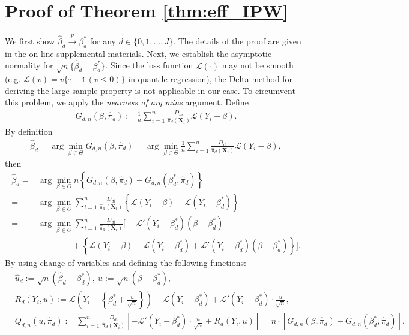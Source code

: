 \documentclass[11pt]{article}
\numberwithin{equation}{section}
\begin{document}
\section{Proof of Theorem \ref{thm:eff_IPW}}\label{app:thm:eff_IPW_shorter}	
We first show $\widehat{\beta}_d\xrightarrow{p}\beta_d^*$ for any $d\in\{0,1,...,J\}$. The details of the proof are given in the on-line supplemental materials. Next, we establish the asymptotic normality for $\sqrt{n}\{\widehat{\beta}_d-\beta_d^*\}$. Since the loss function $\mathcal{L}(\cdot)$ may not be smooth (e.g. $\mathcal{L}(v)=v\{\tau-\mathds{1}(v\leq 0)\}$ in quantile regression),  the Delta method for deriving the large sample property is not applicable in our case. To circumvent this problem, we apply the \emph{nearness of arg mins} argument.  Define
\begin{align}\label{def:Gd}
	{G}_{d,n}(\beta,\widehat{\pi}_d):=\frac{1}{n}\sum_{i=1}^n\frac{D_{di}}{\widehat{\pi}_d(\boldsymbol{X}_{i})}\mathcal{L}(Y_i-\beta).
\end{align}
By definition
\begin{align}\label{def:beta_d}
	\widehat{\beta}_d=\arg\min_{\beta\in\Theta} G_{d,n}(\beta,\widehat{\pi}_d)=\arg\min_{\beta\in\Theta}\frac{1}{n}\sum_{i=1}^n\frac{D_{di}}{\widehat{\pi}_d(\boldsymbol{X}_{i})}\mathcal{L}(Y_i-\beta),
\end{align}
then
\begin{align*}
	\widehat{\beta}_d=&\arg\min_{\beta\in\Theta} n\left\{G_{d,n}(\beta,\widehat{\pi}_d)-G_{d,n}(\beta_d^*,\widehat{\pi}_d) \right\}\\
	=&\arg\min_{\beta\in\Theta}\sum_{i=1}^n\frac{D_{di}}{\widehat{\pi}_d(\boldsymbol{X}_{i})}\left\{\mathcal{L}(Y_i-\beta)-\mathcal{L}(Y_i-\beta_d^*)\right\}\\
	=&\arg\min_{\beta\in\Theta}\sum_{i=1}^n\frac{D_{di}}{\widehat{\pi}_d(\boldsymbol{X}_{i})}\bigg[-\mathcal{L}'(Y_i-\beta_d^*)(\beta-\beta_d^*)\\
	&\qquad\qquad +\left\{\mathcal{L}(Y_i-\beta)-\mathcal{L}(Y_i-\beta_d^*)+\mathcal{L}'(Y_i-\beta_d^*)(\beta-\beta_d^*)\right\}\bigg].
\end{align*}
By using change of variables and defining the following functions:
\begin{align*}
	&\widehat{u}_d:=\sqrt{n}(\widehat{\beta}_d-{\beta}_d^*), \  u:=\sqrt{n}(\beta-{\beta}_d^*),\\
	&R_d(Y_i,u):=\mathcal{L}\left(Y_i-\left\{\beta_d^*+\frac{u}{\sqrt{n}}\right\}\right)-\mathcal{L}(Y_i-\beta_d^*)+\mathcal{L}'(Y_i-\beta_d^*)\cdot \frac{u}{\sqrt{n}},\\
	&Q_{d,n}(u,\widehat{\pi}_d):=\sum_{i=1}^n\frac{D_{di}}{\widehat{\pi}_d(\boldsymbol{X}_{i})}\left[-\mathcal{L}'(Y_i-\beta_d^*)\cdot \frac{u}{\sqrt{n}}+R_d(Y_i,u)\right]=n\cdot \left[{G}_{d,n}(\beta,\widehat{\pi}_d)-{G}_{d,n}(\beta_d^*,\widehat{\pi}_d)\right].
\end{align*}
\end{document}
